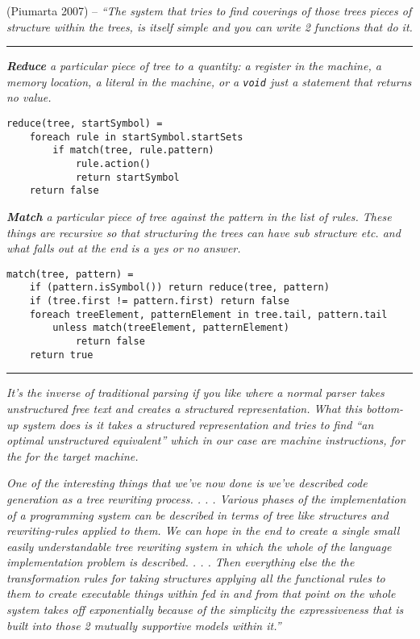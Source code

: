 (Piumarta 2007) -- \emph{``The system that tries to find coverings of
those trees pieces of structure within the trees, is itself simple and
you can write 2 functions that do it.}

\begin{center}\rule{0.5\linewidth}{0.5pt}\end{center}

\emph{\textbf{Reduce} a particular piece of tree to a quantity: a
register in the machine, a memory location, a literal in the machine, or
a \texttt{void} just a statement that returns no value.}

\begin{verbatim}
reduce(tree, startSymbol) =
    foreach rule in startSymbol.startSets
        if match(tree, rule.pattern)
            rule.action()
            return startSymbol
    return false
\end{verbatim}

\emph{\textbf{Match} a particular piece of tree against the pattern in
the list of rules. These things are recursive so that structuring the
trees can have sub structure etc. and what falls out at the end is a yes
or no answer.}

\begin{verbatim}
match(tree, pattern) =
    if (pattern.isSymbol()) return reduce(tree, pattern)
    if (tree.first != pattern.first) return false
    foreach treeElement, patternElement in tree.tail, pattern.tail
        unless match(treeElement, patternElement)
            return false
    return true
\end{verbatim}

\begin{center}\rule{0.5\linewidth}{0.5pt}\end{center}

\emph{It's the inverse of traditional parsing if you like where a normal
parser takes unstructured free text and creates a structured
representation. What this bottom-up system does is it takes a structured
representation and tries to find ``an optimal unstructured equivalent''
which in our case are machine instructions, for the for the target
machine.}

\emph{One of the interesting things that we've now done is we've
described code generation as a tree rewriting process. . . . Various
phases of the implementation of a programming system can be described in
terms of tree like structures and rewriting-rules applied to them. We
can hope in the end to create a single small easily understandable tree
rewriting system in which the whole of the language implementation
problem is described. . . . Then everything else the the transformation
rules for taking structures applying all the functional rules to them to
create executable things within fed in and from that point on the whole
system takes off exponentially because of the simplicity the
expressiveness that is built into those 2 mutually supportive models
within it.''}

